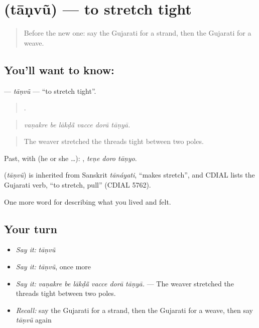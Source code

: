 \section[\texorpdfstring{\gu{તાણવું} (tāṇvũ)}{તાણવું (tāṇvũ)}]{ (tāṇvũ) — to stretch tight}

\label{lesson:GU-C506-tanvu}



\begin{quote}
Before the new one: say the Gujarati for a strand, then the Gujarati for a weave.
\end{quote}

\subsection*{You'll want to know: }
\textbf{} — \emph{tāṇvũ} — \textquotedblleft{}to stretch tight\textquotedblright{}.

\begin{quote}
     .
\end{quote}

\begin{quote}
\emph{vaṇakre be lākḍā̃ vacce dorā tāṇyā.}
\end{quote}

\begin{quote}
The weaver stretched the threads tight between two poles.
\end{quote}

Past, with  (he or she …):   , \emph{teṇe doro tāṇyo}.

\begin{cousinweb}
\textbf{} (\emph{tāṇvũ}) is inherited from Sanskrit \emph{tānáyati}, \textquotedblleft{}makes stretch\textquotedblright{}, and CDIAL lists the Gujarati verb, \textquotedblleft{}to stretch, pull\textquotedblright{} (CDIAL 5762).
\end{cousinweb}

\begin{grammarlens}[title={What you've built}]
One more word for describing what you lived and felt.
\end{grammarlens}

\subsection*{Your turn}
\begin{itemize}
\raggedright
  \item \emph{Say it:} \emph{tāṇvũ}
  \item \emph{Say it:} \emph{tāṇvũ}, once more
  \item \emph{Say it:} \emph{vaṇakre be lākḍā̃ vacce dorā tāṇyā.} — The weaver stretched the threads tight between two poles.
  \item \emph{Recall:} say the Gujarati for a strand, then the Gujarati for a weave, then say \emph{tāṇvũ} again
\end{itemize}

